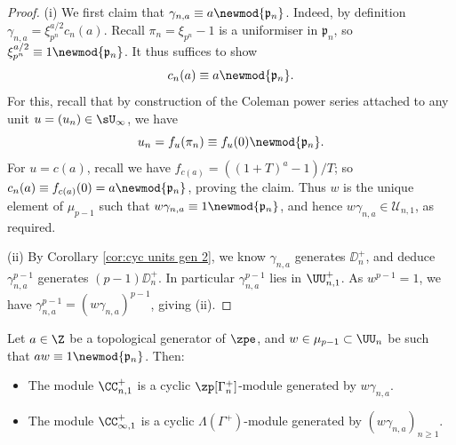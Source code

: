 \documentclass[a4paper,10pt, english, reqno]{smfart}
\newcommand{\GG}{\Gamma}
\numberwithin{equation}{section}
\begin{document}
\begin{proof}
(i) We first claim that $\gamma_{n,a} \equiv a \newmod{\mathfrak{p}_n}$. Indeed, by definition $\gamma_{n,a} = \xi_{p^n}^{a/2} c_n(a)$. Recall $\pi_n = \xi_{p^n} - 1$ is a uniformiser in $\mathfrak{p}_n$, so  $\xi_{p^n}^{a/2} \equiv 1 \newmod{\mathfrak{p}_n}$. It thus suffices to show 
\[
    c_n(a) \equiv a \newmod{\mathfrak{p}_n}.
\]
For this, recall that by construction of the Coleman power series attached to any unit $u = (u_n) \in \sU_\infty$, we have 
\[
    u_n = f_u(\pi_n) \equiv f_u(0) \newmod{\mathfrak{p}_n}.
\]
For $u = c(a)$, recall we have $f_{c(a)} = ((1+T)^a - 1)/T$; so $c_n(a) \equiv f_{c(a)}(0) = a \newmod{\mathfrak{p}_n}$, proving the claim. Thus $w$ is the unique element of $\mu_{p-1}$ such that $w\gamma_{n,a} \equiv 1 \newmod{\mathfrak{p}_n}$, and hence $w\gamma_{n,a} \in \mathscr{U}_{n,1}$, as required.

(ii) By Corollary \ref{cor:cyc units gen 2}, we know $\gamma_{n,a}$ generates $\DD_n^+$, and deduce $\gamma_{n,a}^{p-1}$ generates $(p-1)\DD_{n}^+$. In particular $\gamma_{n,a}^{p-1}$ lies in $\UU_{n,1}^+$. As $w^{p-1} = 1$, we have $\gamma_{n,a}^{p-1}= (w\gamma_{n,a})^{p-1}$, giving (ii).
\end{proof}


\begin{lemma} \label{LemmaGeneratorCinfty1}
Let $a \in \Z$ be a topological generator of $\zpe$, and $w \in \mu_{p-1} \subset \UU_n$ be such that $aw \equiv 1 \newmod{\mathfrak{p}_n}$. Then:
\begin{itemize}

\item[(i)] The module $\CC_{n,1}^+$ is a cyclic $\zp[\GG^+_n]$-module generated by $w\gamma_{n,a}$.

\item[(ii)] 	The module $\CC^+_{\infty, 1}$ is a cyclic $\Lambda(\GG^+)$-module generated by $(w \gamma_{n,a})_{n \geq 1}$.%
 \end{itemize}
\end{lemma}
\end{document}
